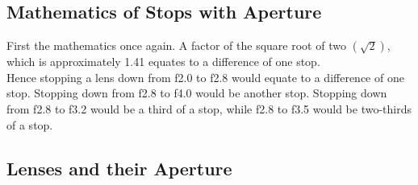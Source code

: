 \subsection{Mathematics of Stops with Aperture}

First the mathematics once again. A factor of the square root of two $\left(\sqrt{2}\right)$, which is approximately 1.41 equates to a difference of one \gls{stop}.
\\
Hence stopping a lens down from f2.0 to f2.8 would equate to a difference of one \gls{stop}. Stopping down from f2.8 to f4.0 would be another \gls{stop}. Stopping down from f2.8 to f3.2 would be a third of a \gls{stop}, while f2.8 to f3.5 would be two-thirds of a \gls{stop}. 

\subsection{Lenses and their Aperture}

